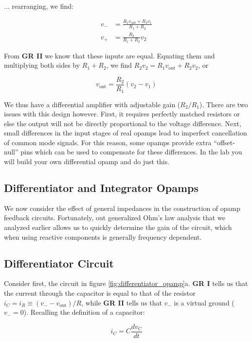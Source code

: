\documentclass{tufte-book}
\begin{document}
\noindent ... rearranging, we find:

\begin{align}
v_- &= \frac{R_1v_\text{out} + R_2v_1}{R_1+R_2} \\
v_+ &= \frac{R_2}{R_1+R_2}v_2
\end{align}



From \textbf{GR II} we know that these inputs are equal. Equating them and multiplying both sides by $R_1 + R_2$, we find $R_2v_2 = R_1v_\text{out} + R_2v_2$, or

\begin{equation}
\label{eq:differential_opamp}
v_\text{out} = \frac{R_2}{R_1}\left(v_2-v_1\right)
\end{equation}

We thus have a differential amplifier with adjustable gain ($R_2/R_1$). There are two issues with this design however. First, it requires perfectly matched resistors or else the output will not be directly proportional to the voltage difference. Next, small differences in the input stages of real opamps lead to imperfect cancellation of common mode signals. For this reason, some opamps provide extra ``offset-null'' pins which can be used to compensate for these differences. In the lab you will build your own differential opamp and do just this.

\subsection{Differentiator and Integrator Opamps}
We now consider the effect of general impedances in the construction of opamp feedback circuits. Fortunately, out generalized Ohm's law analysis that we analyzed earlier allows us to quickly determine the gain of the circuit, which when using reactive components is generally frequency dependent. 

\subsection{Differentiator Circuit}
Consider first, the circuit in figure \ref{fig:differentiator_opamp}a. \textbf{GR I} tells us that the current through the capacitor is equal to that of the resistor $i_C = i_R \equiv \left(v_--v_\text{out}\right)/R$, while \textbf{GR II} tells us that $v_-$ is a virtual ground ($v_- = 0$). Recalling the definition of a capacitor:

\begin{equation}
\label{eq:defn_capacitor_rep}
i_C = C\frac{dv_C}{dt}
\end{equation}
\end{document}
